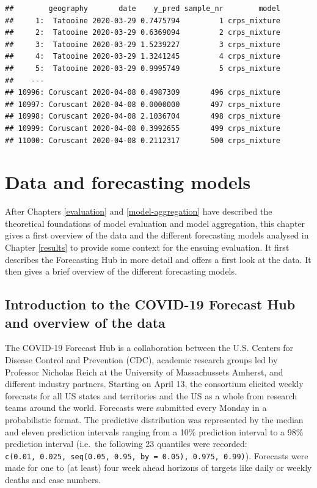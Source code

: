\documentclass[
]{book}
\begin{document}
\begin{verbatim}
##        geography       date    y_pred sample_nr        model
##     1:  Tatooine 2020-03-29 0.7475794         1 crps_mixture
##     2:  Tatooine 2020-03-29 0.6369094         2 crps_mixture
##     3:  Tatooine 2020-03-29 1.5239227         3 crps_mixture
##     4:  Tatooine 2020-03-29 1.3241245         4 crps_mixture
##     5:  Tatooine 2020-03-29 0.9995749         5 crps_mixture
##    ---                                                      
## 10996: Coruscant 2020-04-08 0.4987309       496 crps_mixture
## 10997: Coruscant 2020-04-08 0.0000000       497 crps_mixture
## 10998: Coruscant 2020-04-08 2.1036704       498 crps_mixture
## 10999: Coruscant 2020-04-08 0.3992655       499 crps_mixture
## 11000: Coruscant 2020-04-08 0.2112317       500 crps_mixture
\end{verbatim}

\hypertarget{background-data}{%
\chapter{Data and forecasting models}\label{background-data}}

After Chapters \ref{evaluation} and \ref{model-aggregation} have described the theoretical foundations of model evaluation and model aggregation, this chapter gives a first overview of the data and the different forecasting models analysed in Chapter \ref{results} to provide some context for the ensuing evaluation. It first describes the Forecasting Hub in more detail and offers a first look at the data. It then gives a brief overview of the different forecasting models.

\hypertarget{introduction-to-the-covid-19-forecast-hub-and-overview-of-the-data}{%
\section{Introduction to the COVID-19 Forecast Hub and overview of the data}\label{introduction-to-the-covid-19-forecast-hub-and-overview-of-the-data}}

The COVID-19 Forecast Hub \citep{umass-amherstinfluenzaforecastingcenterofexcellenceCovid19forecasthubOrg2020} is a collaboration between the U.S. Centers for Disease Control and Prevention (CDC), academic research groups led by Professor Nicholas Reich at the University of Massachussets Amherst, and different industry partners. Starting on April 13, the consortium elicited weekly forecasts for all US states and territories and the US as a whole from research teams around the world. Forecasts were submitted every Monday in a probabilistic format. The predictive distribution was represented by the median and eleven prediction intervals ranging from a 10\% prediction interval to a 98\% prediction interval (i.e.~the following 23 quantiles were recorded: \texttt{c(0.01,\ 0.025,\ seq(0.05,\ 0.95,\ by\ =\ 0.05),\ 0.975,\ 0.99)}). Forecasts were made for one to (at least) four week ahead horizons of targets like daily or weekly deaths and case numbers.
\end{document}
